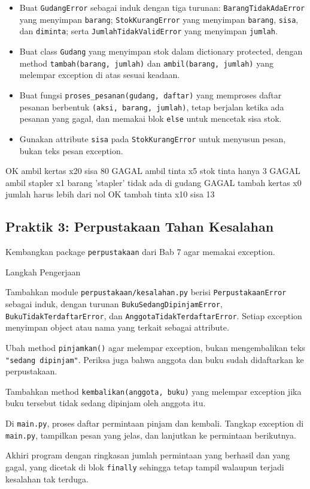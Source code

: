 \begin{itemize}
  \item Buat \texttt{GudangError} sebagai induk dengan tiga turunan: \texttt{BarangTidakAdaError} yang menyimpan \texttt{barang}; \texttt{StokKurangError} yang menyimpan \texttt{barang}, \texttt{sisa}, dan \texttt{diminta}; serta \texttt{JumlahTidakValidError} yang menyimpan \texttt{jumlah}.
  \item Buat class \texttt{Gudang} yang menyimpan stok dalam dictionary protected, dengan method \texttt{tambah(barang, jumlah)} dan \texttt{ambil(barang, jumlah)} yang melempar exception di atas sesuai keadaan.
  \item Buat fungsi \texttt{proses\_pesanan(gudang, daftar)} yang memproses daftar pesanan berbentuk \texttt{(aksi, barang, jumlah)}, tetap berjalan ketika ada pesanan yang gagal, dan memakai blok \texttt{else} untuk mencetak sisa stok.
  \item Gunakan attribute \texttt{sisa} pada \texttt{StokKurangError} untuk menyusun pesan, bukan teks pesan exception.
\end{itemize}

\begin{keluaran}
OK    ambil  kertas  x20  sisa 80
GAGAL ambil  tinta   x5   stok tinta hanya 3
GAGAL ambil  stapler x1   barang 'stapler' tidak ada di gudang
GAGAL tambah kertas  x0   jumlah harus lebih dari nol
OK    tambah tinta   x10  sisa 13
\end{keluaran}

\subsection{Praktik 3: Perpustakaan Tahan Kesalahan}

Kembangkan package \texttt{perpustakaan} dari Bab 7 agar memakai exception.

\begin{langkah}{Langkah Pengerjaan}
  \item Tambahkan module \texttt{perpustakaan/kesalahan.py} berisi \texttt{PerpustakaanError} sebagai induk, dengan turunan \texttt{BukuSedangDipinjamError}, \texttt{BukuTidakTerdaftarError}, dan \texttt{AnggotaTidakTerdaftarError}. Setiap exception menyimpan object atau nama yang terkait sebagai attribute.
  \item Ubah method \texttt{pinjamkan()} agar melempar exception, bukan mengembalikan teks \texttt{"sedang dipinjam"}. Periksa juga bahwa anggota dan buku sudah didaftarkan ke perpustakaan.
  \item Tambahkan method \texttt{kembalikan(anggota, buku)} yang melempar exception jika buku tersebut tidak sedang dipinjam oleh anggota itu.
  \item Di \texttt{main.py}, proses daftar permintaan pinjam dan kembali. Tangkap exception di \texttt{main.py}, tampilkan pesan yang jelas, dan lanjutkan ke permintaan berikutnya.
  \item Akhiri program dengan ringkasan jumlah permintaan yang berhasil dan yang gagal, yang dicetak di blok \texttt{finally} sehingga tetap tampil walaupun terjadi kesalahan tak terduga.
\end{langkah}

